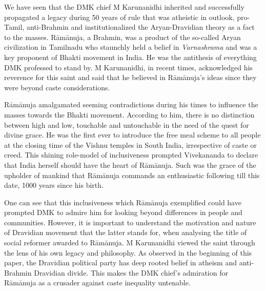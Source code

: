 We have seen that the DMK chief M Karunanidhi inherited and successfully propagated a legacy during 50 years of rule that was atheistic in outlook, pro-Tamil, anti-Brahmin and institutionalized the Aryan-Dravidian theory as a fact to the masses. Rāmānuja, a Brahmin, was a product of the so-called Aryan civilization in Tamilnadu who staunchly held a belief in \textit{Varnashrama} and was a key proponent of Bhakti movement in India. He was the antithesis of everything DMK professed to stand by. M Karunanidhi, in recent times, acknowledged his reverence for this saint and said that he believed in Rāmānuja’s ideas since they were beyond caste considerations.

Rāmānuja amalgamated seeming contradictions during his times to influence the masses towards the Bhakti movement. According to him, there is no distinction between high and low, touchable and untouchable in the need of the quest for divine grace. He was the first ever to introduce the free meal scheme to all people at the closing time of the Vishnu temples in South India, irrespective of caste or creed. This shining role-model of inclusiveness prompted Vivekananda to declare that India herself should have the heart of Rāmānuja. Such was the grace of the upholder of mankind that Rāmānuja commands an enthusiastic following till this date, 1000 years since his birth.

One can see that this inclusiveness which Rāmānuja exemplified could have prompted DMK to admire him for looking beyond differences in people and communities. However, it is important to understand the motivation and nature of Dravidian movement that the latter stands for, when analysing the title of social reformer awarded to Rāmānuja. M Karunanidhi viewed the saint through the lens of his own legacy and philosophy. As observed in the beginning of this paper, the Dravidian political party has deep rooted belief in atheism and anti-Brahmin Dravidian divide. This makes the DMK chief’s admiration for Rāmānuja as a crusader against caste inequality untenable.

